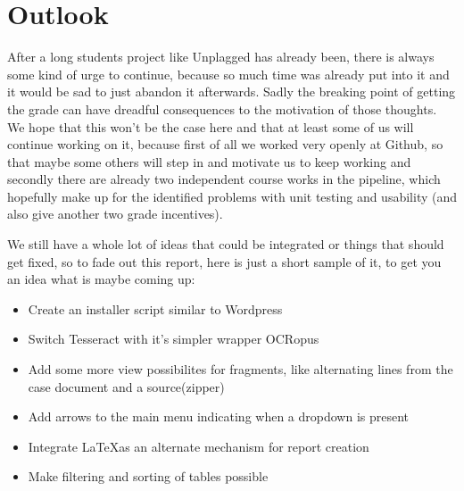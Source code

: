 \section{Outlook}

After a long students project like Unplagged has already been, there is always some kind of urge to continue, because so much time was already put into it and it would be sad to just abandon it afterwards. Sadly the breaking point of getting the grade can have dreadful consequences to the motivation of those thoughts. We hope that this won't be the case here and that at least some of us will continue working on it, because first of all we worked very openly at Github, so that maybe some others will step in and motivate us to keep working and secondly there are already two independent course works in the pipeline, which hopefully make up for the identified problems with unit testing and usability (and also give another two grade incentives).

We still have a whole lot of ideas that could be integrated or things that should get fixed, so to fade out this report, here is just a short sample of it, to get you an idea what is maybe coming up:

\begin{itemize}
\item Create an installer script similar to Wordpress
\item Switch Tesseract with it's simpler wrapper OCRopus
\item Add some more view possibilites for fragments, like alternating lines from the case document and a source(zipper)
\item Add arrows to the main menu indicating when a dropdown is present
\item Integrate \LaTeX as an alternate mechanism for report creation
\item Make filtering and sorting of tables possible
\end{itemize}